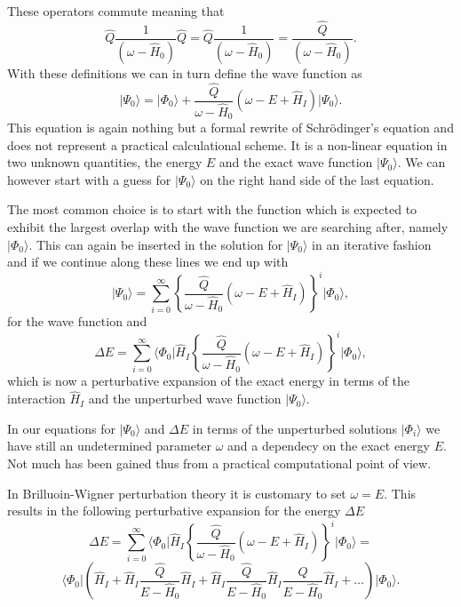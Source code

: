 \documentclass[%
twoside,                 %
final,                   %
10pt]{article}
\begin{document}
These operators commute meaning that
\[
\hat{Q}\frac{1}{\left(\omega-\hat{H}_0\right)}\hat{Q}=\hat{Q}\frac{1}{\left(\omega-\hat{H}_0\right)}=\frac{\hat{Q}}{\left(\omega-\hat{H}_0\right)}.
\]
With these definitions we can in turn define the wave function as 
\[
\vert \Psi_0\rangle=\vert \Phi_0\rangle+\frac{\hat{Q}}{\omega-\hat{H}_0}\left(\omega-E+\hat{H}_I\right)\vert \Psi_0\rangle.
\]
This equation is again nothing but a formal rewrite of Schr\"odinger's equation
and does not represent a practical calculational scheme.  
It is a non-linear equation in two unknown quantities, the energy $E$ and the exact
wave function $\vert \Psi_0\rangle$. We can however start with a guess for $\vert \Psi_0\rangle$ on the right hand side of the last equation.



 The most common choice is to start with the function which is expected to exhibit the largest overlap with the wave function we are searching after, namely $\vert \Phi_0\rangle$. This can again be inserted in the solution for $\vert \Psi_0\rangle$ in an iterative fashion and if we continue along these lines we end up with
\[
\vert \Psi_0\rangle=\sum_{i=0}^{\infty}\left\{\frac{\hat{Q}}{\omega-\hat{H}_0}\left(\omega-E+\hat{H}_I\right)\right\}^i\vert \Phi_0\rangle, 
\]
for the wave function and
\[
\Delta E=\sum_{i=0}^{\infty}\langle \Phi_0\vert \hat{H}_I\left\{\frac{\hat{Q}}{\omega-\hat{H}_0}\left(\omega-E+\hat{H}_I\right)\right\}^i\vert \Phi_0\rangle, 
\]
which is now  a perturbative expansion of the exact energy in terms of the interaction
$\hat{H}_I$ and the unperturbed wave function $\vert \Psi_0\rangle$.



In our equations for $\vert \Psi_0\rangle$ and $\Delta E$ in terms of the unperturbed
solutions $\vert \Phi_i\rangle$  we have still an undetermined parameter $\omega$
and a dependecy on the exact energy $E$. Not much has been gained thus from a practical computational point of view. 

In Brilluoin-Wigner perturbation theory it is customary to set $\omega=E$. This results in the following perturbative expansion for the energy $\Delta E$
\[
\Delta E=\sum_{i=0}^{\infty}\langle \Phi_0\vert \hat{H}_I\left\{\frac{\hat{Q}}{\omega-\hat{H}_0}\left(\omega-E+\hat{H}_I\right)\right\}^i\vert \Phi_0\rangle=
\]
\[
\langle \Phi_0\vert \left(\hat{H}_I+\hat{H}_I\frac{\hat{Q}}{E-\hat{H}_0}\hat{H}_I+
\hat{H}_I\frac{\hat{Q}}{E-\hat{H}_0}\hat{H}_I\frac{\hat{Q}}{E-\hat{H}_0}\hat{H}_I+\dots\right)\vert \Phi_0\rangle. 
\]
\end{document}

